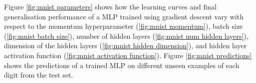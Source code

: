 Figure \ref{fig:mnist parameters} shows how the learning curves and final generalisation performance of a MLP trained using gradient descent vary with respect to the momentum hyperparameter (\ref{fig:mnist momentum}), batch size (\ref{fig:mnist batch size}), number of hidden layers (\ref{fig:mnist num hidden layers}), dimension of the hidden layers (\ref{fig:mnist hidden dimension}), and hidden layer activation function (\ref{fig:mnist activation function}). Figure \ref{fig:mnist predictions} shows the predictions of a trained MLP on different unseen examples of each digit from the test set.
